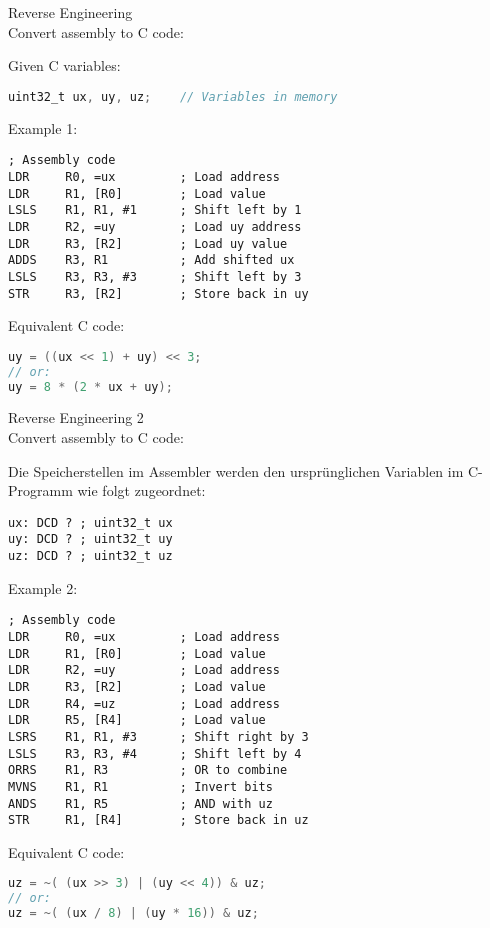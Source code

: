 \begin{example2}{Reverse Engineering}\\
Convert assembly to C code:

Given C variables:
\begin{lstlisting}[language=C, style=basesmol]
uint32_t ux, uy, uz;    // Variables in memory
\end{lstlisting}

Example 1:
\begin{lstlisting}[language=armasm, style=basesmol]
; Assembly code
LDR     R0, =ux         ; Load address
LDR     R1, [R0]        ; Load value
LSLS    R1, R1, #1      ; Shift left by 1
LDR     R2, =uy         ; Load uy address
LDR     R3, [R2]        ; Load uy value
ADDS    R3, R1          ; Add shifted ux
LSLS    R3, R3, #3      ; Shift left by 3
STR     R3, [R2]        ; Store back in uy
\end{lstlisting}

Equivalent C code:
\begin{lstlisting}[language=C, style=basesmol]
uy = ((ux << 1) + uy) << 3;
// or: 
uy = 8 * (2 * ux + uy);
\end{lstlisting}
\end{example2}

\begin{example2}{Reverse Engineering 2}\\
Convert assembly to C code:

Die Speicherstellen im Assembler werden den ursprünglichen Variablen im C-Programm wie folgt zugeordnet:
\begin{lstlisting}[language=armasm, style=basesmol]
ux: DCD ? ; uint32_t ux
uy: DCD ? ; uint32_t uy
uz: DCD ? ; uint32_t uz
\end{lstlisting}

Example 2:
\begin{lstlisting}[language=armasm, style=basesmol]
; Assembly code
LDR     R0, =ux         ; Load address
LDR     R1, [R0]        ; Load value
LDR     R2, =uy         ; Load address
LDR     R3, [R2]        ; Load value
LDR     R4, =uz         ; Load address
LDR     R5, [R4]        ; Load value
LSRS    R1, R1, #3      ; Shift right by 3
LSLS    R3, R3, #4      ; Shift left by 4
ORRS    R1, R3          ; OR to combine
MVNS    R1, R1          ; Invert bits
ANDS    R1, R5          ; AND with uz
STR     R1, [R4]        ; Store back in uz
\end{lstlisting}

Equivalent C code:
\begin{lstlisting}[language=C, style=basesmol]
uz = ~( (ux >> 3) | (uy << 4)) & uz;
// or:
uz = ~( (ux / 8) | (uy * 16)) & uz;
\end{lstlisting}
\end{example2}

